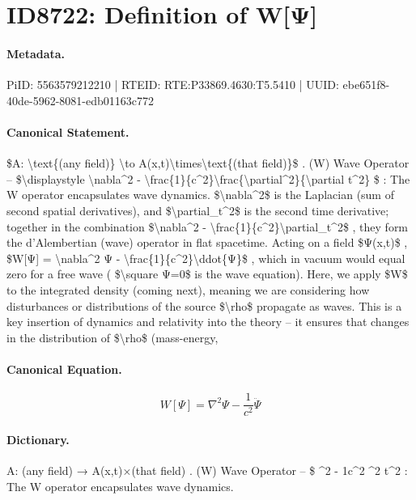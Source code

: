 \section*{ID8722: Definition of W[Ψ]}
\paragraph{Metadata.}
PiID: 5563579212210 | RTEID: RTE:P33869.4630:T5.5410 | UUID: ebe651f8-40de-5962-8081-edb01163c772

\paragraph{Canonical Statement.}
\$A: \textbackslash{}text\{(any field)\} \textbackslash{}to A(x,t)\textbackslash{}times\textbackslash{}text\{(that field)\}\$ . (W) Wave Operator – \$\textbackslash{}displaystyle \textbackslash{}nabla\textasciicircum{}2 - \textbackslash{}frac\{1\}\{c\textasciicircum{}2\}\textbackslash{}frac\{\textbackslash{}partial\textasciicircum{}2\}\{\textbackslash{}partial t\textasciicircum{}2\} \$ : The W operator encapsulates wave dynamics. \$\textbackslash{}nabla\textasciicircum{}2\$ is the Laplacian (sum of second spatial derivatives), and \$\textbackslash{}partial\_t\textasciicircum{}2\$ is the second time derivative; together in the combination \$\textbackslash{}nabla\textasciicircum{}2 - \textbackslash{}frac\{1\}\{c\textasciicircum{}2\}\textbackslash{}partial\_t\textasciicircum{}2\$ , they form the d’Alembertian (wave) operator in flat spacetime. Acting on a field \$Ψ(x,t)\$ , \$W[Ψ] = \textbackslash{}nabla\textasciicircum{}2 Ψ - \textbackslash{}frac\{1\}\{c\textasciicircum{}2\}\textbackslash{}ddot\{Ψ\}\$ , which in vacuum would equal zero for a free wave ( \$\textbackslash{}square Ψ=0\$ is the wave equation). Here, we apply \$W\$ to the integrated density (coming next), meaning we are considering how disturbances or distributions of the source \$\textbackslash{}rho\$ propagate as waves. This is a key insertion of dynamics and relativity into the theory – it ensures that changes in the distribution of \$\textbackslash{}rho\$ (mass-energy,

\paragraph{Canonical Equation.}
\[
W[Ψ] = \nabla^2 Ψ - \frac{1}{c^2}\ddot{Ψ}
\]

\paragraph{Dictionary.}
A: (any field) → A(x,t)×(that field) . (W) Wave Operator – \$ \textasciicircum{}2 - 1c\textasciicircum{}2 \textasciicircum{}2 t\textasciicircum{}2 : The W operator encapsulates wave dynamics.

